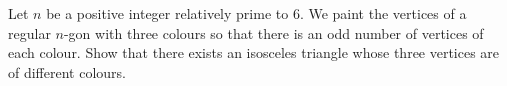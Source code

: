 Let 
$n$
 be a positive integer relatively prime to 
$6$. 
 We paint the vertices of a regular 
$n$-gon with three colours so that there is an odd number of vertices of each colour. Show that there exists an isosceles triangle whose three vertices are of different colours.
